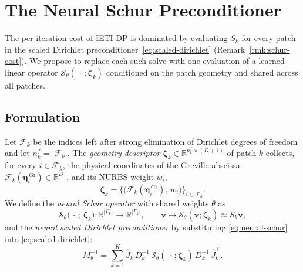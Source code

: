 \documentclass{article}
\newcommand{\vect}[1]{\boldsymbol{#1}}
\newcommand{\R}{\mathbb{R}}
\newcommand{\skel}{\Gamma} %
\newcommand{\npatch}{K} %
\newcommand{\gmapk}[1]{\mathcal{F}_{#1}}         %
\newcommand{\Jskel}[1]{\widehat{J}_{#1}}         %
\newcommand{\Sloc}[1]{S_{#1}}                    %
\newcommand{\Snn}{\mathcal{S}_{\theta}}          %
\newcommand{\Pneural}{M_{\theta}^{-1}}            %
\newcommand{\Dmult}[1]{D_{#1}}                   %
\theoremstyle{plain}
\numberwithin{equation}{section}
\begin{document}
\section{The Neural Schur Preconditioner}
\label{sec:neural-prec}

The per-iteration cost of IETI-DP is dominated by evaluating $\Sloc{k}$ for
every patch in the scaled Dirichlet preconditioner~\eqref{eq:scaled-dirichlet}
(Remark~\ref{rmk:schur-cost}).
We propose to replace each such solve with one evaluation of a learned linear
operator $\Snn(\,\cdot\,;\vect{\zeta}_k)$ conditioned on the patch geometry and
shared across all patches.

\subsection{Formulation}
\label{subsec:formulation}

Let $\mathcal F_k$ be the indices left after strong elimination of Dirichlet
degrees of freedom and let $n_k^f=|\mathcal F_k|$.  The \emph{geometry
    descriptor} $\vect{\zeta}_k \in \R^{n_k^f \times (D+1)}$ of patch $k$ collects,
for every $i\in\mathcal F_k$, the physical coordinates of the Greville
abscissa $\gmapk{k}(\vect{\eta}^{\,\mathrm{Gr}}_i) \in \R^D$ \cite{cottrell2009isogeometric}, and its NURBS weight $w_i$,
\begin{equation}
    \vect{\zeta}_k
    = \bigl\{ \bigl(\gmapk{k}(\vect{\eta}^{\,\mathrm{Gr}}_i),\, w_i\bigr)
    \bigr\}_{i\in\mathcal F_k}.
    \label{eq:geom-features}
\end{equation}
We define the \emph{neural Schur operator} with shared weights $\theta$ as
\begin{equation}
    \Snn\bigl(\,\cdot\,;\, \vect{\zeta}_k\bigr)
    : \R^{|\skel_k|} \to \R^{|\skel_k|},
    \qquad
    \vect{v} \mapsto \Snn(\vect{v}; \vect{\zeta}_k) \approx \Sloc{k} \vect{v},
    \label{eq:neural-schur}
\end{equation}
and the \emph{neural scaled Dirichlet preconditioner} by substituting \eqref{eq:neural-schur}
into \eqref{eq:scaled-dirichlet}:
\begin{equation}
    \Pneural = \sum_{k=1}^{\npatch}
    \Jskel{k}\, \Dmult{k}^{-1}\, \Snn(\,\cdot\,;\vect{\zeta}_k)\,
    \Dmult{k}^{-1}\, \Jskel{k}^{\top}.
    \label{eq:neural-prec}
\end{equation}
\end{document}
